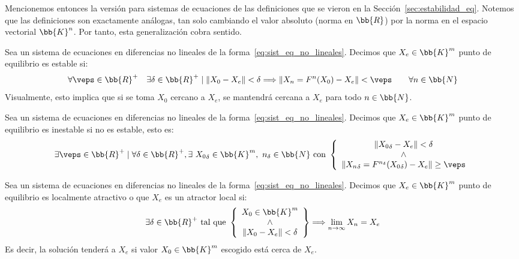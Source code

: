 Mencionemos entonces la versión para sistemas de ecuaciones de las definiciones que se vieron en la Sección~\ref{sec:estabilidad_eq}. Notemos que las definiciones son exactamente análogas, tan solo cambiando el valor absoluto (norma en $\bb{R}$) por la norma en el espacio vectorial $\bb{K}^n$. Por tanto, esta generalización cobra sentido.
\begin{definicion}
    Sea un sistema de ecuaciones en diferencias no lineales de la forma~\ref{eq:sist_eq_no_lineales}. Decimos que $X_e\in \bb{K}^m$ punto de equilibrio es estable si:
    \begin{equation*}
        \forall \veps \in \bb{R}^+ \quad \exists \delta \in \bb{R}^+ \mid \|X_0-X_e\| < \delta \Longrightarrow \|X_n=F^n(X_0)-X_e\|<\veps \qquad \forall n\in \bb{N}
    \end{equation*}
    Visualmente, esto implica que si se toma $X_0$ cercano a $X_e$, se mantendrá cercana a $X_e$ para todo $n\in \bb{N}$.
\end{definicion}
\begin{definicion}
    Sea un sistema de ecuaciones en diferencias no lineales de la forma~\ref{eq:sist_eq_no_lineales}. Decimos que $X_e\in \bb{K}^m$ punto de equilibrio es inestable si no es estable, esto es:
    \begin{equation*}
        \exists \veps \in \bb{R}^+ \mid \forall \delta \in \bb{R}^+, \exists~ {X_0}_\delta\in \bb{K}^m,~n_\delta\in \bb{N} \text{ con }
        \left\{\begin{array}{c}
             \|{X_0}_\delta-X_e\|< \delta \\\land \\\|{X_n}_{\delta}=F^{n_\delta}({X_0}_\delta)-X_e\| \geq \veps
        \end{array}\right.
    \end{equation*}
\end{definicion}

\begin{definicion}
    Sea un sistema de ecuaciones en diferencias no lineales de la forma~\ref{eq:sist_eq_no_lineales}. Decimos que $X_e\in \bb{K}^m$ punto de equilibrio es localmente atractivo o que $X_e$ es un atractor local si:
    \begin{equation*}
        \exists \delta \in \bb{R}^+ \text{ tal que } \left\{\begin{array}{c}
            X_0\in \bb{K}^m \\ \land \\ \|X_0-X_e\| < \delta
        \end{array}\right\} \Longrightarrow \lim_{n \to \infty} X_n = X_e
    \end{equation*}
    Es decir, la solución tenderá a $X_e$ si valor $X_0\in \bb{K}^m$ escogido está cerca de $X_e$.
\end{definicion}

